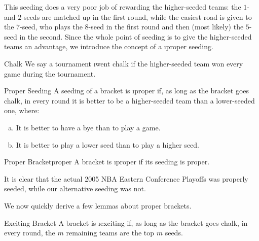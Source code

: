 {    This seeding does a very poor job of rewarding the higher-seeded teams: the $1$- and $2$-seeds are matched up in the first round, while the easiest road is given to the $7$-seed, who plays the $8$-seed in the first round and then (most likely) the $5$-seed in the second. Since the whole point of seeding is to give the higher-seeded teams an advantage, we introduce the concept of a \i{proper seeding.}

    \begin{definition}{Chalk}{}
        We say a tournament \i{went chalk} if the higher-seeded team won every game during the tournament.
    \end{definition}

    \begin{definition}{Proper Seeding}{}
        A seeding of a bracket is \i{proper} if, as long as the bracket goes chalk, in every round it is better to be a higher-seeded team than a lower-seeded one, where:
        \begin{enumerate}[(a)]
            \item It is better to have a bye than to play a game.
            \item It is better to play a lower seed than to play a higher seed.
        \end{enumerate}
    \end{definition}

    \begin{definition}{Proper Bracket}{proper}
        A bracket is \i{proper} if its seeding is proper.
    \end{definition}

    It is clear that the actual 2005 NBA Eastern Conference Playoffs was properly seeded, while our alternative seeding was not.

    We now quickly derive a few lemmas about proper brackets.


    \begin{definition}{Exciting Bracket}{}
        A bracket is \i{exciting} if, as long as the bracket goes chalk, in every round, the $m$ remaining teams are the top $m$ seeds.
    \end{definition}


}
